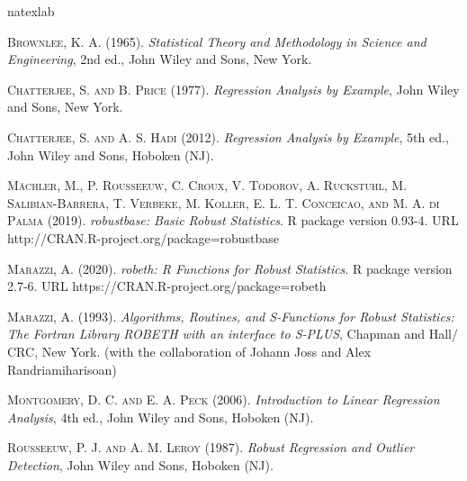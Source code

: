 \documentclass[a4paper,oneside,11pt,DIV=12]{scrartcl}
\begin{document}
\begin{thebibliography}{14}
\expandafter\ifx\csname natexlab\endcsname\relax\def\natexlab#1{#1}\fi

    \textsc{Brownlee, K. A.} (1965).
    \emph{Statistical Theory and Methodology in Science and Engineering},
    2nd ed., John Wiley and Sons, New York.

    \textsc{Chatterjee, S. and B. Price} (1977).
    \emph{Regression Analysis by Example},
    John Wiley and Sons, New York.

    \textsc{Chatterjee, S. and A. S. Hadi} (2012).
    \emph{Regression Analysis by Example},
    5th ed., John Wiley and Sons, Hoboken (NJ).

    \textsc{M{\"a}chler, M., P. Rousseeuw, C. Croux, V. Todorov, A. Ruckstuhl,
    M.  Salibian-Barrera, T. Verbeke, M. Koller, E. L. T. Conceicao, and
    M. A. di Palma} (2019).
    \emph{robustbase: Basic Robust Statistics}.
    R package version 0.93-4.
    URL http://CRAN.R-project.org/package=robustbase

    \textsc{Marazzi, A. (2020).}
    \emph{robeth: R Functions for Robust Statistics}.
    R package version 2.7-6.
    URL https://CRAN.R-project.org/package=robeth

    \textsc{Marazzi, A.} (1993).
    \emph{Algorithms, Routines, and S-Functions for Robust Statistics:
    The Fortran Library ROBETH with an interface to S-PLUS},
    Chapman and Hall/ CRC, New York. (with the collaboration of Johann
    Joss and Alex Randriamiharisoan)

    \textsc{Montgomery, D. C. and E. A. Peck} (2006).
    \emph{Introduction to Linear Regression Analysis},
    4th ed., John Wiley and Sons, Hoboken (NJ).

\textsc{Rousseeuw, P. J. and A. M. Leroy} (1987).
    \emph{Robust Regression and Outlier Detection},
    John Wiley and Sons, Hoboken (NJ).


\end{thebibliography}
\end{document}
